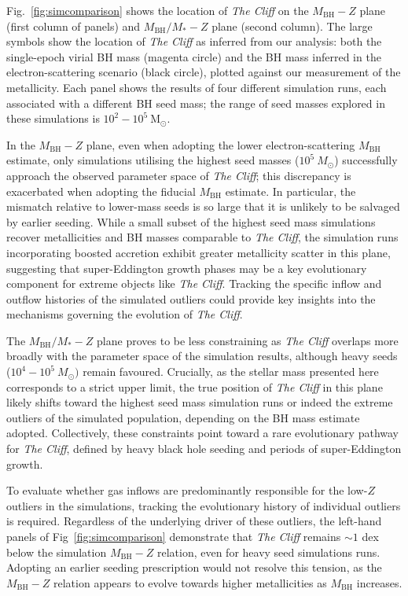 \documentclass[fleqn,usenatbib]{mnras}
\newcommand{\cliff}{\textit{The Cliff}\xspace}
\begin{document}
Fig.~\ref{fig:simcomparison} shows the location of \cliff on the $M_\mathrm{BH}-Z$ plane (first column of panels) and $M_\mathrm{BH}/M_\ast-Z$ plane (second column). 
The large symbols show the location of \cliff as inferred from our analysis: both the single-epoch virial BH mass (magenta circle) and the BH mass inferred in the electron-scattering scenario (black circle), plotted against our measurement of the metallicity. 
Each panel shows the results of four different simulation runs, each associated with a different BH seed mass; the range of seed masses explored in these simulations is $10^2 - 10^5 \ \mathrm{M}_\odot$. 

In the $M_\mathrm{BH}-Z$ plane, even when adopting the lower electron-scattering $M_\mathrm{BH}$ estimate, only simulations utilising the highest seed masses ($10^5 \ M_\odot$) successfully approach the observed parameter space of \cliff; this discrepancy is exacerbated when adopting the fiducial $M_\mathrm{BH}$ estimate.
In particular, the mismatch relative to lower-mass seeds is so large that it is unlikely to be salvaged by earlier seeding.
While a small subset of the highest seed mass simulations recover metallicities and BH masses comparable to \cliff, the simulation runs incorporating boosted accretion exhibit greater metallicity scatter in this plane, suggesting that super-Eddington growth phases may be a key evolutionary component for extreme objects like \cliff. Tracking the specific inflow and outflow histories of the simulated outliers could provide key insights into the mechanisms governing the evolution of \cliff.

The $M_\mathrm{BH}/M_\ast-Z$ plane proves to be less constraining as \cliff overlaps more broadly with the parameter space of the simulation results, although heavy seeds ($10^4-10^5 \ M_\odot)$ remain favoured. 
Crucially, as the stellar mass presented here corresponds to a strict upper limit, the true position of \cliff in this plane likely shifts toward the highest seed mass simulation runs or indeed the extreme outliers of the simulated population, depending on the BH mass estimate adopted.
Collectively, these constraints point toward a rare evolutionary pathway for \cliff, defined by heavy black hole seeding and periods of super-Eddington growth.

To evaluate whether gas inflows are predominantly responsible for the low-$Z$ outliers in the simulations, tracking the evolutionary history of individual outliers is required. Regardless of the underlying driver of these outliers, the left-hand panels of Fig~\ref{fig:simcomparison} demonstrate that \cliff remains $\sim 1$ dex below the simulation $M_\mathrm{BH}-Z$ relation, even for heavy seed simulations runs. Adopting an earlier seeding prescription would not resolve this tension, as the $M_\mathrm{BH}-Z$ relation appears to evolve towards higher metallicities as $M_\mathrm{BH}$ increases.
\end{document}
